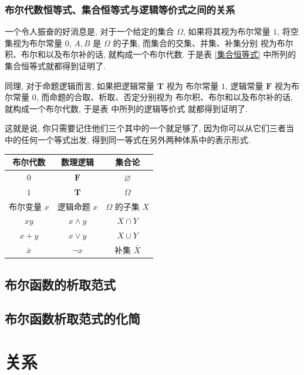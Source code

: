\documentclass[10pt,UTF8]{book} %
\begin{document}
\subsection{布尔代数恒等式、集合恒等式与逻辑等价式之间的关系}

一个令人振奋的好消息是, 对于一个给定的集合 $\varOmega$, 如果将其视为布尔常量 $1$,
将空集视为布尔常量 $0$, $A,B$ 是 $\varOmega$ 的子集, 而集合的交集、并集、补集分别
视为布尔积、布尔和以及布尔补的话, 就构成一个布尔代数. 于是表 \ref{集合恒等式} 中所列的
集合恒等式就都得到证明了. 

同理, 对于命题逻辑而言, 如果把逻辑常量 $\mathbf{T}$ 视为
布尔常量 $1$, 逻辑常量 $\mathbf{F}$ 视为布尔常量 $0$, 而命题的合取、析取、否定分别视为
布尔积、布尔和以及布尔补的话, 就构成一个布尔代数, 于是表 中所列的逻辑等价式
就都得到证明了.

这就是说, 你只需要记住他们三个其中的一个就足够了, 因为你可以从它们三者当中的任何一个等式出发,
得到同一等式在另外两种体系中的表示形式.

{ %
\label{布尔代数、集合运算与逻辑运算之间的关系} %
\begin{longtable}{ccc}
    \toprule
    \textbf{布尔代数} & \textbf{数理逻辑} & \textbf{集合论} \\
    \toprule
    \endhead
    \bottomrule
    \endfoot

    $0$ & $\mathbf{F}$ & $\varnothing$ \\ 
    $1$ & $\mathbf{T}$ & $\varOmega$ \\ 
    布尔变量 $x$ & 逻辑命题 $x$ & $\Omega$ 的子集 $X$ \\
    $xy$ & $x \wedge y$ & $X \cap Y$ \\ 
    $x+y$ & $x \vee y$ & $X \cup Y$ \\
    $\bar x$ & $\lnot x$ & 补集 $\bar X$ \\
\end{longtable}}

\section{布尔函数的析取范式}
\section{布尔函数析取范式的化简}

\chapter{关系}
\end{document}
